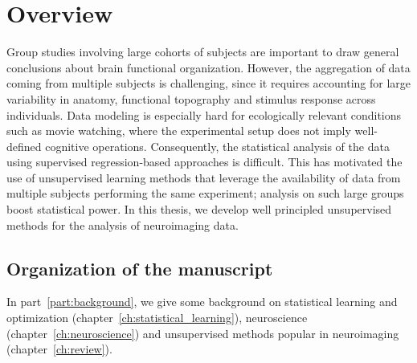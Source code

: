 \documentclass[ twoside,openright,titlepage,numbers=noenddot,%
                headinclude,footinclude,cleardoublepage=empty,abstract=on,
                BCOR=5mm,paper=a4,fontsize=11pt, 
                ]{scrreprt}
\begin{document}
\frenchspacing
\raggedbottom
{} %
\pagestyle{plain}
% 

% 

\cleardoublepage
\pagestyle{scrheadings}
\cleardoublepage


\chapter{Overview}
Group studies involving large cohorts of subjects are important to draw general
conclusions about brain functional organization. However, the aggregation of
data coming from multiple subjects is challenging, since it requires accounting
for large variability in anatomy, functional topography and stimulus response
across individuals. Data modeling is especially hard for ecologically relevant
conditions such as movie watching, where the experimental setup does not imply
well-defined cognitive operations. Consequently, the statistical analysis of the
data using supervised regression-based approaches is difficult. This has
motivated the use of unsupervised learning methods that leverage the
availability of data from multiple subjects performing the same experiment;
analysis on such large groups boost statistical power.
In this thesis, we develop well principled unsupervised methods for the analysis
of neuroimaging data.

\section{Organization of the manuscript}
In part~\ref{part:background}, we give some background on statistical learning
and optimization (chapter~\ref{ch:statistical_learning}), neuroscience
(chapter~\ref{ch:neuroscience}) and unsupervised methods popular in neuroimaging (chapter~\ref{ch:review}).
\end{document}
